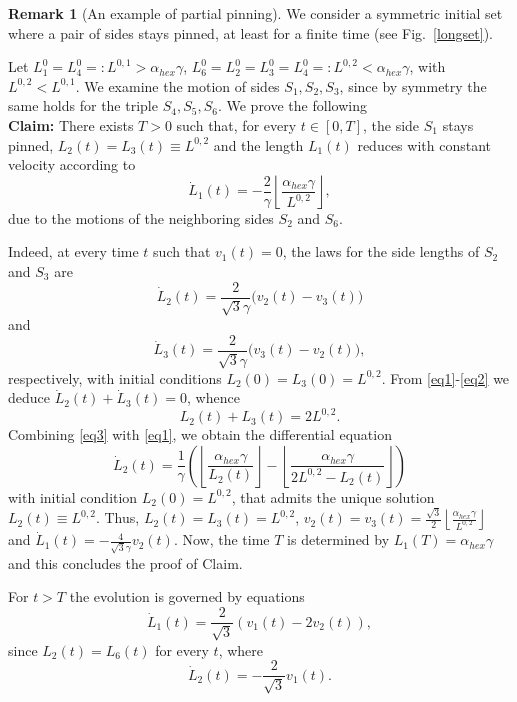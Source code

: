 \documentclass{interact}
\numberwithin{equation}{section}
\theoremstyle{definition}
\newtheorem{oss}[thm]{Remark}
\begin{document}
\begin{oss}[An example of partial pinning] We consider a symmetric initial set where a pair of sides stays pinned, at least for a finite time (see Fig.~\ref{longset}). 

Let $L_1^0=L_{4}^0=:L^{0,1}>\alpha_{hex}\gamma$, $L_{6}^0=L_{2}^0=L_{3}^0=L_{4}^0=:L^{0,2}<\alpha_{hex}\gamma$, with $L^{0,2}<L^{0,1}$.
We examine the motion of sides $S_{1}, S_{2}, S_{3}$, since by symmetry the same holds for the triple $S_{4}, S_{5}, S_{6}$. We prove the following\\
\noindent
{\bf Claim:} There exists $T>0$ such that, for every $t\in[0,T]$, the side $S_1$ stays pinned, $L_{2}(t)=L_{3}(t)\equiv L^{0,2}$ and the length $L_1(t)$ reduces with constant velocity according to
\begin{equation}
\dot{L}_1(t)=-\frac{2}{\gamma}\left\lfloor\frac{\alpha_{hex}\gamma}{L^{0,2}}\right\rfloor,
\end{equation}
due to the motions of the neighboring sides $S_2$ and $S_6$. 

Indeed, at every time $t$ such that $v_1(t)=0$, the laws for the side lengths of $S_2$ and $S_3$ are
\begin{equation}
\dot{L}_2(t)=\frac{2}{\sqrt{3}\gamma}\bigl(v_2(t)-v_3(t)\bigr)
\label{eq1}
\end{equation}
and
\begin{equation}
\dot{L}_3(t)=\frac{2}{\sqrt{3}\gamma}\bigl(v_3(t)-v_2(t)\bigr),
\label{eq2}
\end{equation}
respectively, with initial conditions $L_2(0)=L_3(0)=L^{0,2}$. From \eqref{eq1}-\eqref{eq2} we deduce $\dot{L}_2(t)+\dot{L}_3(t)=0$, whence 
\begin{equation}
L_2(t)+L_3(t)=2L^{0,2}.
\label{eq3}
\end{equation}
Combining \eqref{eq3} with \eqref{eq1}, we obtain the differential equation
\begin{equation}
\dot{L}_2(t)=\frac{1}{\gamma}\left(\left\lfloor\frac{\alpha_{hex}\gamma}{L_2(t)}\right\rfloor-\left\lfloor\frac{\alpha_{hex}\gamma}{2L^{0,2}-L_2(t)}\right\rfloor\right)
\end{equation}
with initial condition $L_2(0)=L^{0,2}$, that admits the unique solution $L_2(t)\equiv L^{0,2}$. Thus, $L_2(t)=L_3(t)=L^{0,2}$, $v_2(t)=v_3(t)=\frac{\sqrt{3}}{2}\left\lfloor\frac{\alpha_{hex}\gamma}{L^{0,2}}\right\rfloor$ and $\dot{L}_1(t)=-\frac{4}{\sqrt{3}\gamma}v_2(t)$. Now, the time $T$ is determined by $L_1(T)=\alpha_{hex}\gamma$ and this concludes the proof of Claim. 

For $t>T$ the evolution is governed by equations
\begin{equation*}
\dot{L}_1(t)=\frac{2}{\sqrt{3}}\left(v_1(t)-2v_{2}(t)\right),
\label{lato1}
\end{equation*}
since $L_{2}(t)=L_{6}(t)$ for every $t$, where
\begin{equation*}
\dot{L}_{2}(t)=-\frac{2}{\sqrt{3}}v_1(t).%
\end{equation*} 
\label{esempiopartial}
\end{oss}
\end{document}

